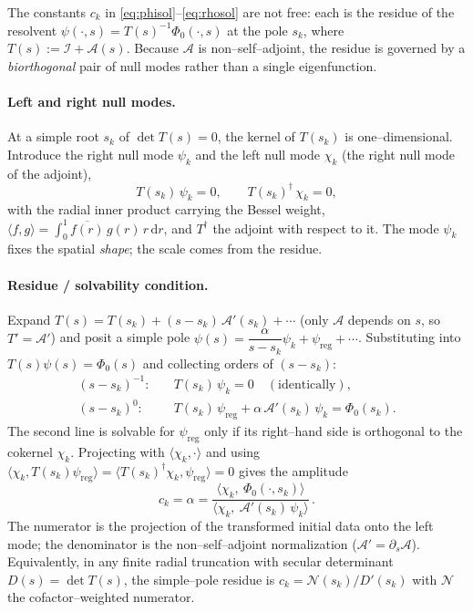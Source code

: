 \documentclass{article}
\newcommand{\rd}{\mathrm{d}}
\begin{document}
The constants $c_k$ in \eqref{eq:phisol}--\eqref{eq:rhosol} are not free: each is
the residue of the resolvent $\psi(\cdot,s)=T(s)^{-1}\Phi_0(\cdot,s)$ at the pole
$s_k$, where $T(s):=\mathcal I+\mathcal A(s)$. Because $\mathcal A$ is
non--self--adjoint, the residue is governed by a \emph{biorthogonal} pair of null
modes rather than a single eigenfunction.

\paragraph{Left and right null modes.} At a simple root $s_k$ of
$\det T(s)=0$, the kernel of $T(s_k)$ is one--dimensional. Introduce the right
null mode $\psi_k$ and the left null mode $\chi_k$ (the right null mode of the
adjoint),
\begin{equation}
T(s_k)\,\psi_k=0,
\qquad
T(s_k)^{\dagger}\,\chi_k=0,
\label{eq:nullmodes}
\end{equation}
with the radial inner product carrying the Bessel weight,
$\langle f,g\rangle=\int_0^1\overline{f(r)}\,g(r)\,r\,\rd r$, and $T^\dagger$ the
adjoint with respect to it. The mode $\psi_k$ fixes the spatial \emph{shape}; the
scale comes from the residue.

\paragraph{Residue / solvability condition.} Expand
$T(s)=T(s_k)+(s-s_k)\,\mathcal A'(s_k)+\cdots$ (only $\mathcal A$ depends on $s$,
so $T'=\mathcal A'$) and posit a simple pole
$\psi(s)=\dfrac{\alpha}{s-s_k}\psi_k+\psi_{\mathrm{reg}}+\cdots$. Substituting into
$T(s)\psi(s)=\Phi_0(s)$ and collecting orders of $(s-s_k)$:
\begin{align}
(s-s_k)^{-1}:&\quad T(s_k)\,\psi_k=0 \quad(\text{identically}),\\
(s-s_k)^{0}:&\quad T(s_k)\,\psi_{\mathrm{reg}}+\alpha\,\mathcal A'(s_k)\,\psi_k
=\Phi_0(s_k).
\end{align}
The second line is solvable for $\psi_{\mathrm{reg}}$ only if its right--hand side
is orthogonal to the cokernel $\chi_k$. Projecting with $\langle\chi_k,\cdot\rangle$
and using $\langle\chi_k,T(s_k)\psi_{\mathrm{reg}}\rangle
=\langle T(s_k)^\dagger\chi_k,\psi_{\mathrm{reg}}\rangle=0$ gives the amplitude
\begin{equation}
\boxed{\;
c_k=\alpha=
\frac{\langle\chi_k,\ \Phi_0(\cdot,s_k)\rangle}
{\langle\chi_k,\ \mathcal A'(s_k)\,\psi_k\rangle}\,.
\;}
\label{eq:ck}
\end{equation}
The numerator is the projection of the transformed initial data onto the left
mode; the denominator is the non--self--adjoint normalization
($\mathcal A'=\partial_s\mathcal A$). Equivalently, in any finite radial
truncation with secular determinant $D(s)=\det T(s)$, the simple--pole residue is
$c_k=\mathcal N(s_k)/D'(s_k)$ with $\mathcal N$ the cofactor--weighted numerator.
\end{document}
